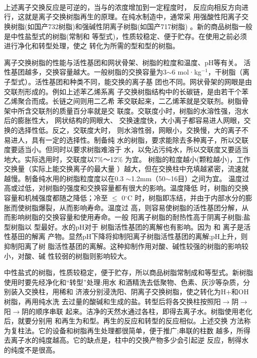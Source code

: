{\centering
{}\\
\\
\\}

上述离子交换反应是可逆的，当与的浓度增加到一定程度时，
反应向相反方向进行，这就是离子交换树脂再生的原理。在纯水制造中，通常采
用强酸性阳离子交换树脂(如国产732树脂)和强碱性阴离子树脂(如国产717树脂)
。新的商品树脂一般是中性盐型式的树脂(常制和
等型式)，性质较稳定、便于贮存。在使用之前必须进行净化和转型处理，使之
转化为所需的型和型的树脂。

离子交换树脂的性能与活性基团和网状骨架、树脂的粒度和温度、pH等有关。
 活性基团越多，交换容量越大。一般树脂的交换容量为3$\sim$6 
mol·kg$^{-1}$，干树脂（离子型式）。活性基团和种类不同，能交换的离子基
团也不同。网状骨架的网眼是由交联剂形成的。例如上述苯乙烯系离
子交换树脂结构中的长碳链，是由若干个苯乙烯聚合而成。长链之间则用二乙希
苯交联起来，二乙烯苯就是交联剂。树脂骨架中所含交联剂的质量百分率就是交
联度。交联度小时，树脂的水溶性强，泡水后的膨胀性大， 网状结构的网眼大、
交换速度快，大小离子都容易进人网眼，交换的选择性低。反之，交联度大时，
则水溶性弱，网眼小，交换慢，大的离子不易进人，具有一定的选择性。制备纯
水的树脂，要求能除去多种离子，所以交联度要适当小。但同时以要求树脂难溶于
水，以免沾污纯水，所以交联度又要适当地大。实际选用时，交联度以7\%～12\%
为宜。
树脂的粒度越小(颗粒越小)，工作交换量（实际上能交换离子的最大量
）越大，但在交换柱中充填越紧密，流速就越慢。制备纯水用的树脂粒度度以在0.3
$\sim$1.2mm（50$\sim$16目）之间为宜。
温度过高或过低，对树脂的强度和交换容量都有很大的影响。温度降低
时，树脂的交换容量和机械强度都随之降低；冷至 $\leqslant$ 0$^{\circ}\mathrm{C}$
时，树脂即冻结，并由于内部水分的膨胀而使树脂爆裂，从而影响寿命。温度过
高，则容易使树脂的活性基团分解，从而影响树脂的交换容量和使用寿命。一般
阳离子树脂的耐热性高于阴离子树脂;盐型树脂以 型最好。水的pH对于
树脂活性基团的离解也有影响。因为 和 离子是活性基田的解离
产物。显然pH下降将抑制阳离子树脂活性基团的离解;pH上升，则抑制阳离了树
脂活性基团的离解。这种抑制作用对酸、碱性较强的树脂的影响较小，对酸、碱
性较弱的树脂则影响较大。

中性盐式的树脂，性质较稳定，便于贮存，所以商品树脂常制成和等型式。新树脂使用时要先经净化和“转型”处理:用水
和酒精洗去低聚物、色素、灰沙等杂质，分别装入交换柱，用稀和
济液分别浸洗阳、阴离子交换树脂，使之转化为H+和OH树脂，再用纯水洗
去过量的酸碱和生成的盐。转型后将各交换柱按照阳$\rightarrow$阴$\rightarrow$阳$\rightarrow$阴的顺序串联
起来。洁净的天然水通过各柱，即得去离子水。树脂使用老化后，就要分别用
和再生为和型。再生的反应和转型的反应相似。上述交换
方法称为复柱法。它的设备和树脂再生处理都很简单，便于推广;串联的柱数
越多，所得去离子水的纯度越高。它的缺点是，柱中的交换产物多少会引起逆
反应，制得水的纯度不是很高。

